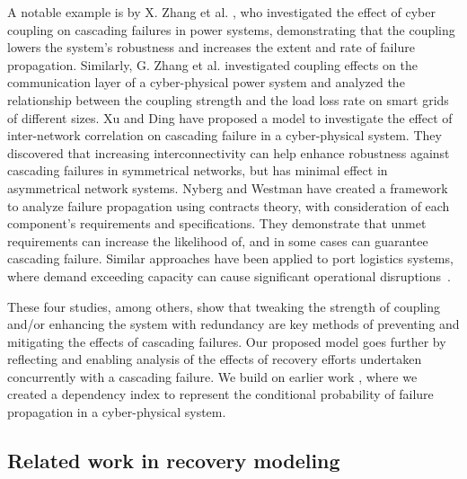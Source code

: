\documentclass[conference]{IEEEtran}
\begin{document}
A notable example is by 
X. Zhang et al. \cite{zhang_effects_2017}, who investigated the effect of cyber coupling on cascading failures in power systems, demonstrating that the coupling lowers the system's robustness and increases the extent and rate of failure propagation. 
Similarly, G. Zhang et al. \cite{zhang_cascading_2021} investigated coupling effects on the communication layer of a cyber-physical power system and analyzed the relationship between the coupling strength and the load loss rate on smart grids of different sizes. Xu and Ding \cite{xu_cascading_2024} have proposed a model to investigate the effect of inter-network correlation on cascading failure in a cyber-physical system. They discovered that increasing interconnectivity can help enhance robustness against cascading failures in symmetrical networks, but has minimal effect in asymmetrical network systems.
Nyberg and Westman \cite{nyberg_failure_2015} have created a framework to analyze failure propagation using contracts theory, with consideration of each component's requirements and specifications. They demonstrate that unmet requirements can increase the likelihood of, and in some cases can guarantee cascading failure. Similar approaches have been applied to port logistics systems, where demand exceeding capacity can cause significant operational disruptions~\cite{wang_resilience_2026}.%


These four studies, among others, show that tweaking the 
strength of coupling and/or enhancing the system with redundancy are key methods of preventing and mitigating the effects of cascading failures. Our proposed model goes further by reflecting and enabling analysis of the effects of recovery efforts undertaken concurrently with a cascading failure. We build on earlier work \cite{marashi_identification_2021}, where we created a dependency index to represent the conditional probability of failure propagation in a cyber-physical system. 


\subsection{Related work in recovery modeling}
\end{document}
